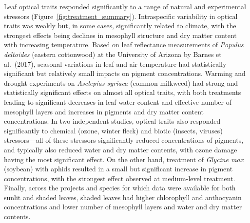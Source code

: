 Leaf optical traits responded significantly to a range of natural and experimental stressors (Figure~\ref{fig:treatment_summary}).
Intraspecific variability in optical traits was weakly but, in some cases, significantly related to climate, with the strongest effects being declines in mesophyll structure and dry matter content with increasing temperature.
Based on leaf reflectance measurements of \textit{Populus deltoides} (eastern cottonwood) at the University of Arizona by Barnes et al.~(2017), \nocite{barnes_2017_beyond}
% 
% 
seasonal variations in leaf and air temperature had statistically significant but relatively small impacts on pigment concentrations.
Warming and drought experiments on \textit{Asclepias syriaca} (common milkweed) had strong and statistically significant effects on almost all optical traits, with both treatments leading to significant decreases in leaf water content and effective number of mesophyll layers and increases in pigments and dry matter content concentrations.
% 
% 
In two independent studies, optical traits also responded significantly to chemical (ozone, winter fleck) and biotic (insects, viruses) stressors---all of these stressors significantly reduced concentrations of pigments, and typically also reduced water and dry matter contents, with ozone damage having the most significant effect.
% 
% 
% 
% 
On the other hand, treatment of \textit{Glycine max} (soybean) with aphids resulted in a small but significant increase in pigment concentrations, with the strongest effect observed at medium-level treatment.
Finally, across the projects and species for which data were available for both sunlit and shaded leaves, shaded leaves had higher chlorophyll and anthocyanin concentrations and lower number of mesophyll layers and water and dry matter contents.
% 
% 

